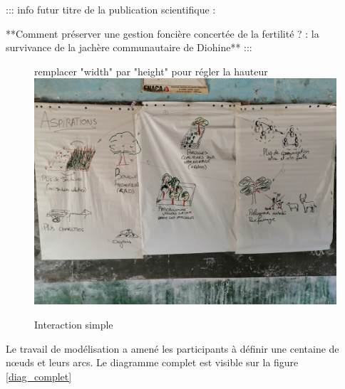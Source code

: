 ::: info
futur titre de la publication scientifique : 

**Comment préserver une gestion foncière concertée de la fertilité ? : la survivance de la jachère communautaire de Diohine**
:::


\begin{figure}
\begin{center}
remplacer "width" par "height" pour régler la hauteur
\includegraphics[width=15cm]{img/aspiration_formulee.jpg}
\end{center}
\caption{Interaction simple }
\label{aspiration}
\end{figure}





Le travail de modélisation a amené les participants à définir une centaine de nœuds et leurs arcs. Le diagramme complet est visible sur la figure \ref{diag_complet} 


